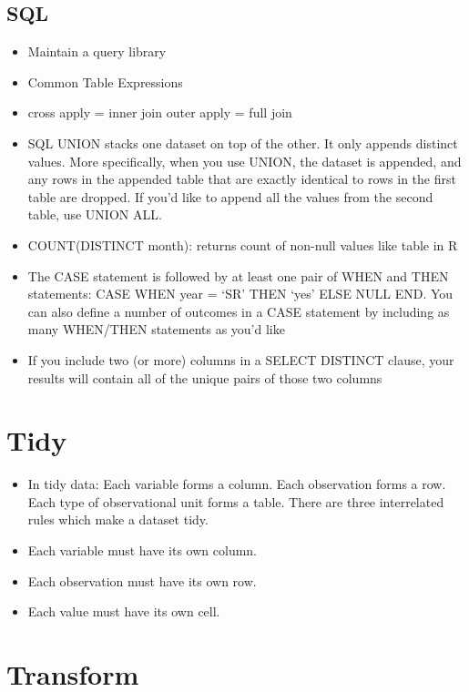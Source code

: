 \documentclass[]{book}
\begin{document}
\subsection{SQL}\label{sql}

\begin{itemize}
\item
  Maintain a query library
\item
  Common Table Expressions
\item
  cross apply = inner join \textbar{} outer apply = full join
\item
  SQL UNION stacks one dataset on top of the other. It only appends
  distinct values. More specifically, when you use UNION, the dataset is
  appended, and any rows in the appended table that are exactly
  identical to rows in the first table are dropped. If you'd like to
  append all the values from the second table, use UNION ALL.
\item
  COUNT(DISTINCT month): returns count of non-null values like table in
  R
\item
  The CASE statement is followed by at least one pair of WHEN and THEN
  statements: CASE WHEN year = `SR' THEN `yes' ELSE NULL END. You can
  also define a number of outcomes in a CASE statement by including as
  many WHEN/THEN statements as you'd like
\item
  If you include two (or more) columns in a SELECT DISTINCT clause, your
  results will contain all of the unique pairs of those two columns
\end{itemize}

\section{Tidy}\label{tidy-1}

\begin{itemize}
\item
  In tidy data: Each variable forms a column. Each observation forms a
  row. Each type of observational unit forms a table. There are three
  interrelated rules which make a dataset tidy.
\item
  Each variable must have its own column.
\item
  Each observation must have its own row.
\item
  Each value must have its own cell.
\end{itemize}

\section{Transform}\label{transform-1}
\end{document}
